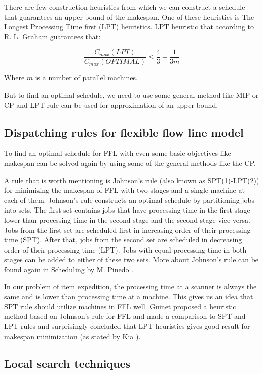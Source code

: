 \documentclass{ctuthesis}
\begin{document}
There are few construction heuristics from which we can construct a schedule that guarantees an upper bound of the makespan. One of these heuristics is The Longest Processing Time first (LPT) heuristics. LPT heuristic  that according to R. L. Graham \cite{gram1969} guarantees that:

\begin{equation}
\dfrac{C_{max}(LPT)}{C_{max}(OPTIMAL)} \leq \dfrac{4}{3} - \dfrac{1}{3m}
\end{equation}

Where $m$ is a number of parallel machines.

But to find an optimal schedule, we need to use some general method like MIP or CP and LPT rule can be used for approximation of an upper bound.

\subsection{Dispatching rules for flexible flow line model}
\label{subsec:ffl}
To find an optimal schedule for FFL with even some basic objectives like makespan can be solved again by using some of the general methods like the CP. 

A rule that is worth mentioning is Johnson's rule (also known as SPT(1)-LPT(2)) for minimizing the makespan of FFL with two stages and a single machine at each of them. Johnson's rule constructs an optimal schedule by partitioning jobs into sets. The first set contains jobs that have processing time in the first stage lower than processing time in the second stage and the second stage vice-versa. 
Jobs from the first set are scheduled first in increasing order of their processing time (SPT). After that, jobs from the second set are scheduled in decreasing order of their processing time (LPT). Jobs with equal processing time in both stages can be added to either of these two sets. More about Johnson's rule can be found again in Scheduling by M. Pinedo \cite{pinedo}.

In our problem of item expedition, the processing time at a scanner is always the same and is lower than processing time at a machine. This gives us an idea that SPT rule should utilize machines in FFL well. Guinet \cite{guinet} proposed a heuristic method based on Johnson's rule for FFL and made a comparison to SPT and LPT rules and surprisingly concluded that LPT heuristics gives good result for makespan minimization (as stated by Kia \cite{kia}).

\subsection{Local search techniques}
\end{document}
